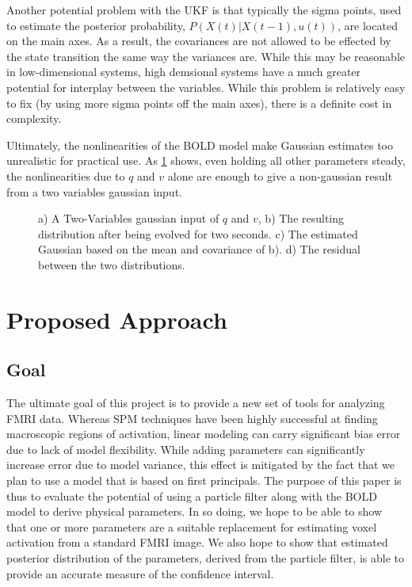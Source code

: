 \documentclass{article}
\begin{document}
Another potential problem with the UKF is that typically the sigma points,
used to estimate the posterior probability, $P(X(t) | X(t-1), u(t))$, are
located on the main axes. As a result, the covariances are not allowed to 
be effected by the state transition the same way the variances are. While
this may be reasonable in low-dimensional systems, high demsional systems
have a much greater potential for interplay between the variables. While
this problem is relatively easy to fix (by using more sigma points off
the main axes), there is a definite cost in complexity.

Ultimately, the nonlinearities of the BOLD model make Gaussian estimates
too unrealistic for practical use. As \ref{fig:Transformation} shows, even 
holding all other parameters steady, the nonlinearities due to $q$ and $v$
alone are enough to give a non-gaussian result from a two variables 
gaussian input. 

\begin{figure}

\label{fig:Transformation}
\caption{a) A Two-Variables gaussian input of $q$ and $v$, b) The 
resulting distribution after being evolved for two seconds. c) The
estimated Gaussian based on the mean and covariance of b). d) The
residual between the two distributions.}
\end{figure}

\section{Proposed Approach}
\subsection{Goal}
The ultimate goal of this project is to provide a new set of tools
for analyzing FMRI data. Whereas SPM techniques have been highly 
successful at finding macroscopic regions of activation, linear 
modeling can carry significant bias error due to lack of model
flexibility. While adding parameters can significantly increase
error due to model variance, this effect is mitigated by the fact
that we plan to use a model that is based on first principals. The
purpose of this paper is thus to evaluate the potential of using
a particle filter along with the BOLD model to derive physical 
parameters. In so doing, we hope to be able to show that one or more
parameters are a suitable replacement for estimating voxel 
activation from a standard FMRI image. We also hope to show that 
estimated posterior distribution of the parameters, derived from
the particle filter, is able to provide an accurate measure of the
confidence interval.
\end{document}
